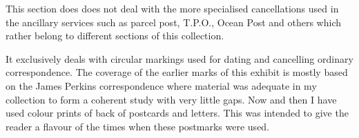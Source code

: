 This section does does not deal with the more specialised cancellations used in the 
ancillary services such as parcel post, T.P.O., Ocean Post and others which rather belong to 
different sections of this collection.
 
It exclusively deals with circular markings used for dating and cancelling ordinary correspondence. 
The coverage of the earlier marks of this exhibit is mostly based on the James Perkins 
correspondence where material was adequate in my collection to form a coherent study with very little gaps. 
Now and then I have used colour prints of back of postcards and letters. 
This was intended to give the reader a flavour of the times when these postmarks were used.

 	    